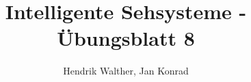 \documentclass[deutsch]{llncs}
\begin{document}
\title{Intelligente Sehsysteme - Übungsblatt 8}


\author{Hendrik Walther, Jan Konrad}
\institute{}
\maketitle

\newpage

\end{document}
